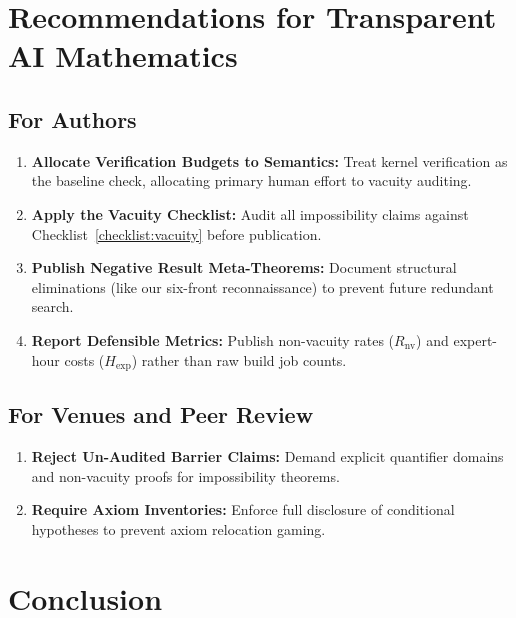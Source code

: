\documentclass[11pt,a4paper]{article}
\theoremstyle{definition}
\theoremstyle{remark}
\begin{document}
\section{Recommendations for Transparent AI Mathematics}
\label{sec:recommendations}

\subsection{For Authors}
\begin{enumerate}[label=\textbf{\arabic*.}]
  \item \textbf{Allocate Verification Budgets to Semantics:} Treat kernel verification as the baseline check, allocating primary human effort to vacuity auditing.
  \item \textbf{Apply the Vacuity Checklist:} Audit all impossibility claims against Checklist~\ref{checklist:vacuity} before publication.
  \item \textbf{Publish Negative Result Meta-Theorems:} Document structural eliminations (like our six-front reconnaissance) to prevent future redundant search.
  \item \textbf{Report Defensible Metrics:} Publish non-vacuity rates ($R_{\text{nv}}$) and expert-hour costs ($H_{\text{exp}}$) rather than raw build job counts.
\end{enumerate}

\subsection{For Venues and Peer Review}
\begin{enumerate}[label=\textbf{\arabic*.}]
  \item \textbf{Reject Un-Audited Barrier Claims:} Demand explicit quantifier domains and non-vacuity proofs for impossibility theorems.
  \item \textbf{Require Axiom Inventories:} Enforce full disclosure of conditional hypotheses to prevent axiom relocation gaming.
\end{enumerate}

\section{Conclusion}
\label{sec:conclusion}
\end{document}
